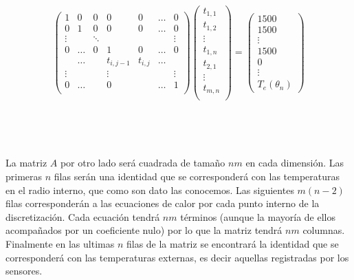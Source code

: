 ~


 \begin{equation*}
\left( \begin{array}{ccccccc}
1 & 0 & 0 & 0 & 0 & \dots & 0\\
0 & 1 & 0 & 0 & 0 & \dots & 0\\
\vdots & & \ddots & & & & \vdots\\
0  & \dots & 0 & 1 & 0 & \dots  & 0\\

  & \dots &  & t_{i,j-1} & t_{i,j} & \dots &\\

\vdots & & & \vdots & & & \vdots\\
0  & \dots & & 0 & & \dots  & 1\\
\end{array} \right)
\left( \begin{array}{c}
t_{1,1} \\
t_{1,2} \\
\vdots \\
t_{1,n} \\
t_{2,1} \\
\vdots \\
t_{m,n} \\ \end{array} \right)
= \left( \begin{array}{c}
1500 \\
1500 \\
\vdots \\
1500\\
0\\
\vdots\\
T_e(\theta_n)\end{array} \right)
\end{equation*}

~

~

La matriz $A$ por otro lado ser\'a cuadrada de tama\~no $nm$ en cada dimensi\'on. Las primeras $n$ filas ser\'an una identidad que se corresponder\'a con las temperaturas en el radio interno, que como son dato las conocemos. Las siguientes $m(n-2)$ filas corresponder\'an a las ecuaciones de calor por cada punto interno de la discretizaci\'on. Cada ecuaci\'on tendr\'a $nm$ t\'erminos (aunque la mayor\'ia de ellos acompa\~nados por un coeficiente nulo) por lo que la matriz tendr\'a $nm$ columnas. Finalmente en las ultimas $n$ filas de la matriz se encontrar\'a la identidad que se corresponder\'a con las temperaturas externas, es decir aquellas registradas por los sensores.


